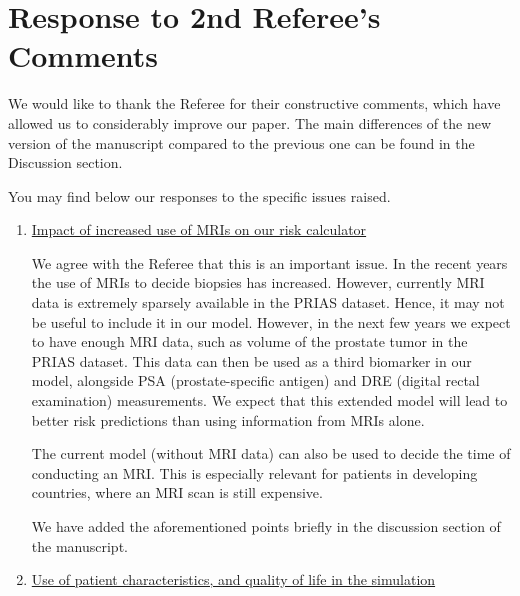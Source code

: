 \clearpage
\section*{Response to 2nd Referee's Comments}
We would like to thank the Referee for their constructive comments, which have allowed us to considerably improve our paper. The main differences of the new version of the manuscript compared to the previous one can be found in the Discussion section.

You may find below our responses to the specific issues raised.

\begin{enumerate}
    \item \underline{Impact of increased use of MRIs on our risk calculator}

    We agree with the Referee that this is an important issue. In the recent years the use of MRIs to decide biopsies has increased. However, currently MRI data is extremely sparsely available in the PRIAS dataset. Hence, it may not be useful to include it in our model. However, in the next few years we expect to have enough MRI data, such as volume of the prostate tumor in the PRIAS dataset. This data can then be used as a third biomarker in our model, alongside PSA (prostate-specific antigen) and DRE (digital rectal examination) measurements. We expect that this extended model will lead to better risk predictions than using information from MRIs alone. 

    The current model (without MRI data) can also be used to decide the time of conducting an MRI. This is especially relevant for patients in developing countries, where an MRI scan is still expensive.

    We have added the aforementioned points briefly in the discussion section of the manuscript.

    \item \underline{Use of patient characteristics, and quality of life in the simulation}


\end{enumerate}
